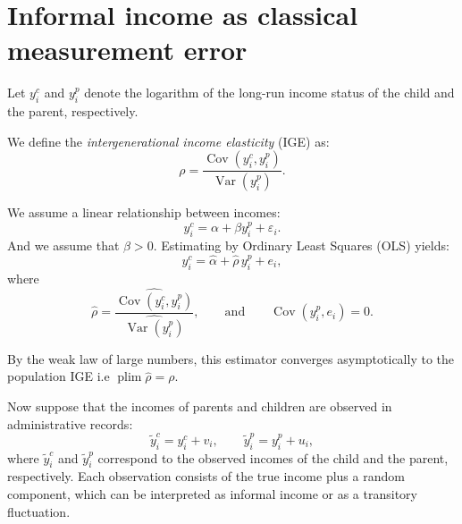 \documentclass[12pt,oneside]{article}
\DeclareMathOperator*{\plim}{plim}
\theoremstyle{bracket}
\begin{document}
\begin{comment}
Suppose \textcolor{blue}{$\operatorname{Var}(y_i^p)=\operatorname{Var}(\hat{y}_i^p)$ (strong assumption)}:

$$(\hat{\beta}_0^c)'\operatorname{Cov}(z_i^c,z_i^p)\hat{\beta}_0^p- (\beta_0^c)'\operatorname{Cov}(z_i^c,z_i^p)\beta_0^p=\frac{1}{2}\frac{(\hat{\beta}^c_0+\beta_0^c)\operatorname{Cov}(z_i^c,z_i^p)(\hat{\beta}^p_0-\beta_0^p)+(\hat{\beta}^c_0-\beta_0^c)\operatorname{Cov}(z_i^c,z_i^p)(\hat{\beta}^p_0+\beta_0^p)}{\operatorname{Var}(y_i^p)}$$
$$\rho+\frac{}{}$$



Agregar lo de las sumas de los ingresos para representar el ingreso representativo.

\end{comment}



\section{Informal income as classical measurement error}

Let $y_i^c$ and $y_i^p$ denote the logarithm of the long-run income status of the child and the parent, respectively.

We define the \textit{intergenerational income elasticity} (IGE) as:
\[
\rho = \frac{\operatorname{Cov}(y_i^c,y_i^p)}{\operatorname{Var}(y_i^p)}.
\]

We assume a linear relationship between incomes:
\[
y_i^c = \alpha + \beta y_i^p + \varepsilon_i.
\]
And we assume that $\beta>0$.
Estimating by Ordinary Least Squares (OLS) yields:
\[
y_i^c = \hat{\alpha} + \hat{\rho}\, y_i^p + e_i,
\]
where
\[
\hat{\rho} = \frac{\widehat{\operatorname{Cov}(y_i^c,y_i^p)}}{\widehat{\operatorname{Var}(y_i^p)}},
\qquad \text{and} \qquad \operatorname{Cov}(y_i^p,e_i) = 0.
\]

By the weak law of large numbers, this estimator converges asymptotically to the population IGE i.e $\plim \hat{\rho} = \rho.$


Now suppose that the incomes of parents and children are observed in administrative records:
\[
\tilde{y}_{i}^c = y_i^c + v_i, \qquad
\tilde{y}_{i}^p = y_i^p + u_i,
\]
where $\tilde{y}_i^c$ and $\tilde{y}_i^p$ correspond to the observed incomes of the child and the parent, respectively.  
Each observation consists of the true income plus a random component, which can be interpreted as informal income or as a transitory fluctuation.
\end{document}
